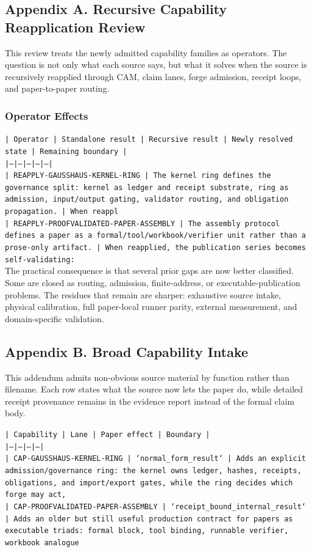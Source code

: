\documentclass[11pt]{article}
\begin{document}
\subsection*{Appendix A. Recursive Capability Reapplication Review}

This review treats the newly admitted capability families as operators. The question is not only what each source says, but what it solves when the source is recursively reapplied through CAM, claim lanes, forge admission, receipt loops, and paper-to-paper routing.

\subsubsection*{Operator Effects}

\noindent\texttt{| Operator | Standalone result | Recursive result | Newly resolved state | Remaining boundary |}\\
\noindent\texttt{|---|---|---|---|---|}\\
\noindent\texttt{| REAPPLY-GAUSSHAUS-KERNEL-RING | The kernel ring defines the governance split: kernel as ledger and receipt substrate, ring as admission, input/output gating, validator routing, and obligation propagation. | When reappl}\\
\noindent\texttt{| REAPPLY-PROOFVALIDATED-PAPER-ASSEMBLY | The assembly protocol defines a paper as a formal/tool/workbook/verifier unit rather than a prose-only artifact. | When reapplied, the publication series becomes self-validating:}\\

The practical consequence is that several prior gaps are now better classified. Some are closed as routing, admission, finite-address, or executable-publication problems. The residues that remain are sharper: exhaustive source intake, physical calibration, full paper-local runner parity, external measurement, and domain-specific validation.

\subsection*{Appendix B. Broad Capability Intake}

This addendum admits non-obvious source material by function rather than filename. Each row states what the source now lets the paper do, while detailed receipt provenance remains in the evidence report instead of the formal claim body.

\noindent\texttt{| Capability | Lane | Paper effect | Boundary |}\\
\noindent\texttt{|---|---|---|---|}\\
\noindent\texttt{| CAP-GAUSSHAUS-KERNEL-RING | `normal\_form\_result` | Adds an explicit admission/governance ring: the kernel owns ledger, hashes, receipts, obligations, and import/export gates, while the ring decides which forge may act,}\\
\noindent\texttt{| CAP-PROOFVALIDATED-PAPER-ASSEMBLY | `receipt\_bound\_internal\_result` | Adds an older but still useful production contract for papers as executable triads: formal block, tool binding, runnable verifier, workbook analogue}\\
\end{document}
